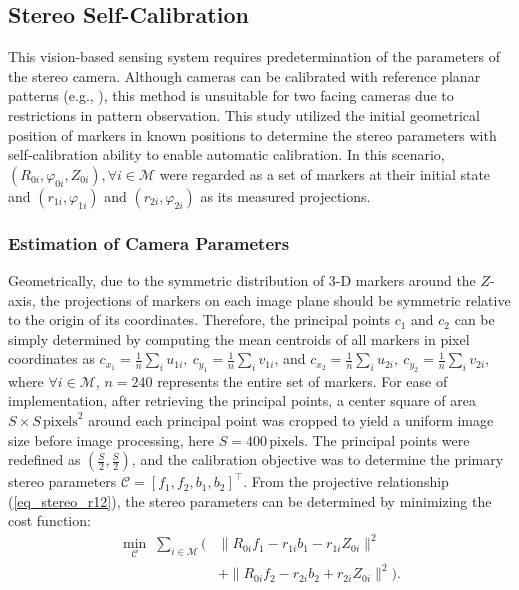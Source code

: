 \documentclass[10pt,letterpaper,journal,final,twoside,twocolumn,nofonttune]{IEEEtran}
\begin{document}
\subsection{Stereo Self-Calibration}
This vision-based sensing system requires predetermination of the parameters of the stereo camera. Although cameras can be calibrated with reference planar patterns (e.g., \cite{Zhang}), this method is unsuitable for two facing cameras due to restrictions in pattern observation. This study utilized the initial geometrical position of markers in known positions to determine the stereo parameters with self-calibration ability to enable automatic calibration. In this scenario, $(R_{0i},\varphi_{0i},Z_{0i}), \forall i \in \mathcal{M}$ were regarded as a set of markers at their initial state and $(r_{1i},\varphi_{1i})$ and $(r_{2i},\varphi_{2i})$ as its measured projections. 
\subsubsection{Estimation of Camera Parameters}
Geometrically, due to the symmetric distribution of 3-D markers around the $Z$-axis, the projections of markers on each image plane should be symmetric relative to the origin of its coordinates. Therefore, the principal points $c_1$ and $c_2$ can be simply determined by computing the mean centroids of all markers in pixel coordinates as $c_{x_1} = \frac{1}{n}\sum\nolimits_{i}u_{1i},\: c_{y_1} = \frac{1}{n}\sum\nolimits_{i}v_{1i}$, and $c_{x_2} = \frac{1}{n}\sum\nolimits_{i}u_{2i},\:c_{y_2} = \frac{1}{n}\sum\nolimits_{i}v_{2i}$, where $\forall i \in \mathcal{M}$, $n=240$ represents the entire set of markers. For ease of implementation, after retrieving the principal points, a center square of area $S\times{S}\,\text{pixels}^2$ around each principal point was cropped to yield a uniform image size before image processing, here $S=400\,\text{pixels}$. The principal points were redefined as $(\frac{S}{2},\frac{S}{2})$, and the calibration objective was to determine the primary stereo parameters $\bm{\mathcal{C}}=[f_1, f_2, b_1, b_2]^{\top}$. 
From the projective relationship (\ref{eq_stereo_r12}), the stereo parameters can be determined by minimizing the cost function:
\begin{equation}
\begin{aligned}
\label{eq_stereo_cali}
\min_{\bm{\mathcal{C}}} \;\sum_{i\in \mathcal{M}} (&\lVert R_{0i}f_1-r_{1i}b_1 - r_{1i}Z_{0i} \rVert^2\\ 
&+ \lVert R_{0i}f_2-r_{2i}b_2 + r_{2i}Z_{0i} \rVert^2).
\end{aligned}
\end{equation}
\end{document}
